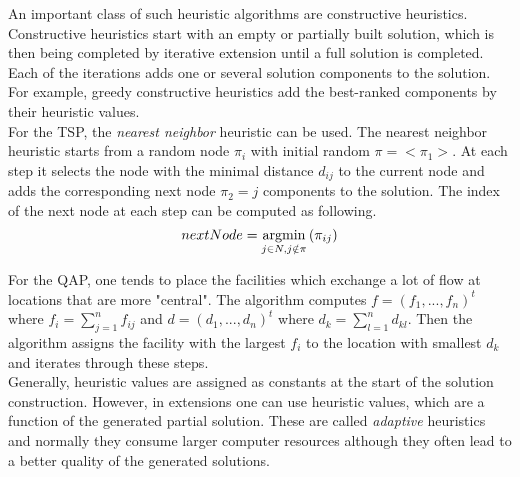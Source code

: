 An important class of such heuristic algorithms are constructive heuristics. Constructive heuristics start with an empty or partially built solution, which is then being completed by iterative extension until a full solution is completed. Each of the iterations adds one or several solution components to the solution. For example, greedy constructive heuristics  add the best-ranked components by their heuristic values. \\

For the TSP, the \emph{nearest neighbor} heuristic can be used. The nearest neighbor heuristic starts from a random node $\pi_i$ with initial random $\pi=<\pi_1>$. At each step it selects the node with the minimal distance $d_{ij}$ to the current node and adds the corresponding next node $\pi_2=j$ components to the solution. The index of the next node at each step can be computed as following.\\

\begin{equation}
nextNode = \operatornamewithlimits{argmin} \limits_{j \in N, j \notin \pi} {(\pi_{ij})}
\end{equation}

For the QAP, one tends to place the facilities which exchange a lot of flow at locations that are more "central". The algorithm computes $f=(f_1,...,f_n)^t$ where $f_i=\sum \limits_{j=1}^n {f_{ij}}$ and $d=(d_1,...,d_n)^t$ where $d_k=\sum \limits_{l=1}^n {d_{kl}}$. Then the algorithm assigns the facility with the largest $f_i$ to the location with smallest $d_k$ and iterates through these steps. \\

Generally, heuristic values are assigned as constants at the start of the solution construction. However, in extensions one can use heuristic values, which are a function of the generated partial solution. These are called \emph{adaptive} heuristics and normally they consume larger computer resources although they often lead to a better quality of the generated solutions.